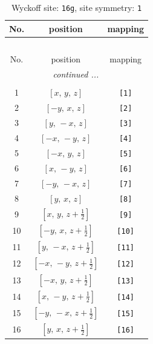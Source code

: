 \documentclass[fleqn,8pt]{jsarticle}
\begin{document}
\begin{longtable}{ccc}
\caption{Wyckoff site: {\tt 16g}, site symmetry: {\tt 1}}
 \\
 \hline \hline
No. & position & mapping \\ \hline \endfirsthead

\multicolumn{2}{l}{\tablename\ \thetable{}} \\
 \hline \hline
No. & position & mapping \\ \hline \endhead

 \hline \hline
\multicolumn{2}{r}{\footnotesize\it continued ...} \\ \endfoot

 \hline \hline
\multicolumn{2}{r}{} \\ \endlastfoot

1 & $\left[ x,\, y,\, z \right]$ & {\tt [1]} \\ \hline
2 & $\left[ - y,\, x,\, z \right]$ & {\tt [2]} \\ \hline
3 & $\left[ y,\, - x,\, z \right]$ & {\tt [3]} \\ \hline
4 & $\left[ - x,\, - y,\, z \right]$ & {\tt [4]} \\ \hline
5 & $\left[ - x,\, y,\, z \right]$ & {\tt [5]} \\ \hline
6 & $\left[ x,\, - y,\, z \right]$ & {\tt [6]} \\ \hline
7 & $\left[ - y,\, - x,\, z \right]$ & {\tt [7]} \\ \hline
8 & $\left[ y,\, x,\, z \right]$ & {\tt [8]} \\ \hline
9 & $\left[ x,\, y,\, z + \frac{1}{2} \right]$ & {\tt [9]} \\ \hline
10 & $\left[ - y,\, x,\, z + \frac{1}{2} \right]$ & {\tt [10]} \\ \hline
11 & $\left[ y,\, - x,\, z + \frac{1}{2} \right]$ & {\tt [11]} \\ \hline
12 & $\left[ - x,\, - y,\, z + \frac{1}{2} \right]$ & {\tt [12]} \\ \hline
13 & $\left[ - x,\, y,\, z + \frac{1}{2} \right]$ & {\tt [13]} \\ \hline
14 & $\left[ x,\, - y,\, z + \frac{1}{2} \right]$ & {\tt [14]} \\ \hline
15 & $\left[ - y,\, - x,\, z + \frac{1}{2} \right]$ & {\tt [15]} \\ \hline
16 & $\left[ y,\, x,\, z + \frac{1}{2} \right]$ & {\tt [16]} \\
\end{longtable}
\end{document}
